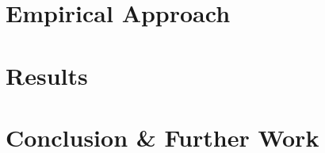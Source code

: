 \documentclass[11pt, oneside]{article}
\begin{document}
	\section{Empirical Approach}
	
	\label{empirical}
	
	\section{Results}
	
	\label{results}
		
	\section{Conclusion \& Further Work}
	
	\label{conclusion}
	\newpage
	
	
	
	
	\newpage
	
	
	\newpage
	

	
	
\end{document}
